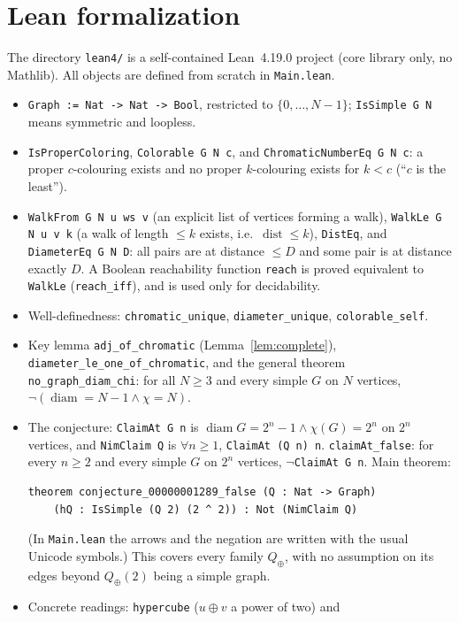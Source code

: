 \documentclass[11pt]{article}
\theoremstyle{definition}
\theoremstyle{remark}
\begin{document}
\section{Lean formalization}
The directory \texttt{lean4/} is a self-contained Lean~4.19.0 project (core
library only, no Mathlib). All objects are defined from scratch in
\texttt{Main.lean}.
\begin{itemize}
\item \texttt{Graph := Nat -> Nat -> Bool}, restricted to $\{0,\dots,N-1\}$;
\texttt{IsSimple G N} means symmetric and loopless.
\item \texttt{IsProperColoring}, \texttt{Colorable G N c}, and
\texttt{ChromaticNumberEq G N c}: a proper $c$-colouring exists and no proper
$k$-colouring exists for $k<c$ (``$c$ is the least'').
\item \texttt{WalkFrom G N u ws v} (an explicit list of vertices forming a walk),
\texttt{WalkLe G N u v k} (a walk of length $\le k$ exists, i.e.\
$\operatorname{dist}\le k$), \texttt{DistEq}, and \texttt{DiameterEq G N D}:
all pairs are at distance $\le D$ and some pair is at distance exactly $D$. A
Boolean reachability function \texttt{reach} is proved equivalent to
\texttt{WalkLe} (\texttt{reach\_iff}), and is used only for decidability.
\item Well-definedness: \texttt{chromatic\_unique}, \texttt{diameter\_unique},
\texttt{colorable\_self}.
\item Key lemma \texttt{adj\_of\_chromatic} (Lemma~\ref{lem:complete}),
\texttt{diameter\_le\_one\_of\_chromatic}, and the general theorem
\texttt{no\_graph\_diam\_chi}: for all $N\ge3$ and every simple $G$ on $N$
vertices, $\neg(\operatorname{diam}=N-1\wedge\chi=N)$.
\item The conjecture: \texttt{ClaimAt G n} is
$\operatorname{diam}G=2^n-1\wedge\chi(G)=2^n$ on $2^n$ vertices, and
\texttt{NimClaim Q} is $\forall n\ge1$, \texttt{ClaimAt (Q n) n}.
\texttt{claimAt\_false}: for every $n\ge2$ and every simple $G$ on $2^n$ vertices,
$\neg$\texttt{ClaimAt G n}. Main theorem:
\begin{verbatim}
theorem conjecture_00000001289_false (Q : Nat -> Graph)
    (hQ : IsSimple (Q 2) (2 ^ 2)) : Not (NimClaim Q)
\end{verbatim}
(In \texttt{Main.lean} the arrows and the negation are written with the usual
Unicode symbols.)
This covers every family $Q_\oplus$, with no assumption on its edges beyond
$Q_\oplus(2)$ being a simple graph.
\item Concrete readings: \texttt{hypercube} ($u\oplus v$ a power of two) and

\end{itemize}
\end{document}
